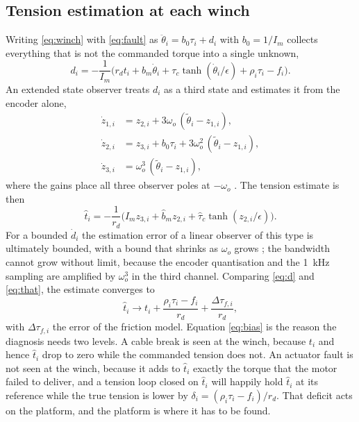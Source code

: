 \documentclass[10pt]{article}
\begin{document}
\subsection{Tension estimation at each winch}

Writing \eqref{eq:winch} with \eqref{eq:fault} as $\ddot\theta_i=b_0\tau_i+d_i$ with $b_0=1/I_m$ collects everything that is not the commanded torque into a single unknown,
\begin{equation}\label{eq:d}
d_i=-\frac{1}{I_m}\Big(r_d t_i+b_m\dot\theta_i+\tau_c\tanh(\dot\theta_i/\epsilon)+\rho_i\tau_i-f_i\Big).
\end{equation}
An extended state observer \citep{han2009pid} treats $d_i$ as a third state and estimates it from the encoder alone,
\begin{equation}\label{eq:eso}
\begin{aligned}
\dot z_{1,i}&=z_{2,i}+3\omega_o\,(\tilde\theta_i-z_{1,i}),\\
\dot z_{2,i}&=z_{3,i}+b_0\tau_i+3\omega_o^2\,(\tilde\theta_i-z_{1,i}),\\
\dot z_{3,i}&=\omega_o^3\,(\tilde\theta_i-z_{1,i}),
\end{aligned}
\end{equation}
where the gains place all three observer poles at $-\omega_o$ \citep{gao2003scaling}. The tension estimate is then
\begin{equation}\label{eq:that}
\hat t_i=-\frac{1}{r_d}\Big(I_m z_{3,i}+\hat b_m z_{2,i}+\hat\tau_c\tanh(z_{2,i}/\epsilon)\Big).
\end{equation}
For a bounded $\dot d_i$ the estimation error of a linear observer of this type is ultimately bounded, with a bound that shrinks as $\omega_o$ grows \citep{guo2011eso}; the bandwidth cannot grow without limit, because the encoder quantisation and the 1~kHz sampling are amplified by $\omega_o^3$ in the third channel. Comparing \eqref{eq:d} and \eqref{eq:that}, the estimate converges to
\begin{equation}\label{eq:bias}
\hat t_i\to t_i+\frac{\rho_i\tau_i-f_i}{r_d}+\frac{\Delta\tau_{f,i}}{r_d},
\end{equation}
with $\Delta\tau_{f,i}$ the error of the friction model. Equation \eqref{eq:bias} is the reason the diagnosis needs two levels. A cable break is seen at the winch, because $t_i$ and hence $\hat t_i$ drop to zero while the commanded tension does not. An actuator fault is not seen at the winch, because it adds to $\hat t_i$ exactly the torque that the motor failed to deliver, and a tension loop closed on $\hat t_i$ will happily hold $\hat t_i$ at its reference while the true tension is lower by $\delta_i=(\rho_i\tau_i-f_i)/r_d$. That deficit acts on the platform, and the platform is where it has to be found.
\end{document}
